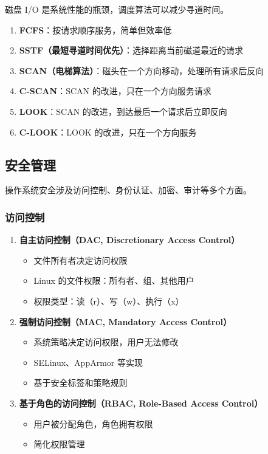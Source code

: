 磁盘 I/O 是系统性能的瓶颈，调度算法可以减少寻道时间。

\begin{enumerate}
  \item \textbf{FCFS}：按请求顺序服务，简单但效率低
  \item \textbf{SSTF（最短寻道时间优先）}：选择距离当前磁道最近的请求
  \item \textbf{SCAN（电梯算法）}：磁头在一个方向移动，处理所有请求后反向
  \item \textbf{C-SCAN}：SCAN 的改进，只在一个方向服务请求
  \item \textbf{LOOK}：SCAN 的改进，到达最后一个请求后立即反向
  \item \textbf{C-LOOK}：LOOK 的改进，只在一个方向服务
\end{enumerate}

\subsection{安全管理}

操作系统安全涉及访问控制、身份认证、加密、审计等多个方面。

\subsubsection{访问控制}


\begin{enumerate}
  \item \textbf{自主访问控制（DAC, Discretionary Access Control）}
    \begin{itemize}
      \item 文件所有者决定访问权限
      \item Linux 的文件权限：所有者、组、其他用户
      \item 权限类型：读（r）、写（w）、执行（x）
    \end{itemize}

  \item \textbf{强制访问控制（MAC, Mandatory Access Control）}
    \begin{itemize}
      \item 系统策略决定访问权限，用户无法修改
      \item SELinux、AppArmor 等实现
      \item 基于安全标签和策略规则
    \end{itemize}

  \item \textbf{基于角色的访问控制（RBAC, Role-Based Access Control）}
    \begin{itemize}
      \item 用户被分配角色，角色拥有权限
      \item 简化权限管理
    \end{itemize}
\end{enumerate}

